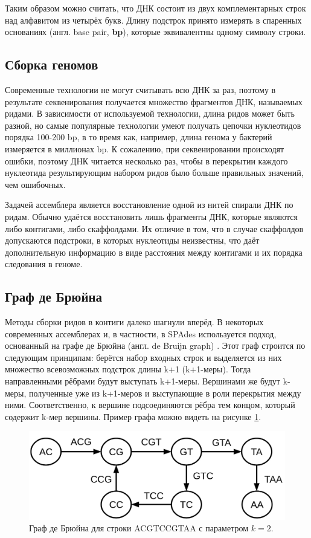 \documentclass[14pt]{matmex-diploma-custom}
\begin{document}
Таким образом можно считать, что ДНК состоит из двух комплементарных строк над алфавитом из четырёх букв. Длину подстрок принято измерять в спаренных основаниях (англ. base pair, \textbf{bp}), которые эквивалентны одному символу строки.

\subsection{Сборка геномов}
Современные технологии не могут считывать всю ДНК за раз, поэтому в результате секвенирования получается множество фрагментов ДНК, называемых ридами. В зависимости от используемой технологии, длина ридов может быть разной, но самые популярные технологии умеют получать цепочки нуклеотидов порядка 100-200 bp, в то время как, например, длина генома у бактерий измеряется в миллионах bp. К сожалению, при секвенировании происходят ошибки, поэтому ДНК читается несколько раз, чтобы в перекрытии каждого нуклеотида результирующим набором ридов было больше правильных значений, чем ошибочных.

Задачей ассемблера является восстановление одной из нитей спирали ДНК по ридам. Обычно удаётся  восстановить лишь фрагменты ДНК, которые являются либо контигами, либо скаффолдами. Их отличие в том, что в случае скаффолдов допускаются подстроки, в которых нуклеотиды неизвестны, что даёт дополнительную информацию в виде расстояния между контигами и их порядка следования в геноме.

\subsection{Граф де Брюйна}
Методы сборки ридов в контиги далеко шагнули вперёд. В некоторых современных ассемблерах и, в частности, в SPAdes используется подход, основанный на графе де Брюйна (англ. de Bruijn graph) \cite{art:Pevzner}. Этот граф строится по следующим принципам: берётся набор входных строк и выделяется из них множество всевозможных подстрок длины k+1 (k+1-меры). Тогда направленными рёбрами будут выступать k+1-меры. Вершинами же будут k-меры, полученные уже из k+1-меров и выступающие в роли перекрытия между ними. Соответственно, к вершине подсоединяются рёбра тем концом, который содержит k-мер вершины. Пример графа можно видеть на рисунке \ref{fig:debruijn}.

\begin{figure}[h]
	\centering
	\includegraphics[scale=0.3]{debruijn.png}
	\caption{Граф де Брюйна для строки ACGTCCGTAA с параметром ${k=2}$.}
	\label{fig:debruijn}
\end{figure}
\end{document}
